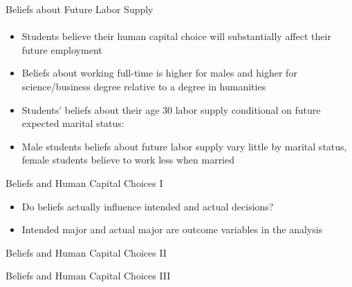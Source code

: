 \documentclass[12pt]{beamer}
\begin{document}
\begin{frame}{Beliefs about Future Labor Supply}
    \framesubtitle{} 
    \begin{itemize}
        \item Students believe their human capital choice will substantially affect their future employment
        \item Beliefs about working full-time is higher for males and higher for science/business degree relative to a degree in humanities
        \item Students' beliefs about their age 30 labor supply conditional on future expected marital status:
        \item Male students beliefs about future labor supply vary little by marital status, female students believe to work less when married
    \end{itemize}
\end{frame}

\begin{frame}{Beliefs and Human Capital Choices I}
    \begin{itemize}
        \item Do beliefs actually influence intended and actual decisions?
        \item Intended major and actual major are outcome variables in the analysis
    \end{itemize}  
\end{frame}

\begin{frame}{Beliefs and Human Capital Choices II}
     \begin{center}
    \end{center}
\end{frame}

\begin{frame}{Beliefs and Human Capital Choices III}
    \begin{center}
    \end{center}
\end{frame}
\end{document}
